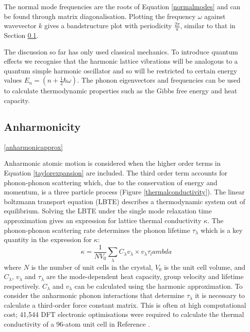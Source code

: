 The normal mode frequencies are the roots of Equation \ref{normalmodes} and can be found through matrix diagonalisation. Plotting the frequency $\omega$ against wavevector $k$ gives a bandstructure plot with periodicity $\frac{2\pi}{a}$, similar to that in Section \ref{}.   %

The discussion so far has only used classical mechanics. To introduce quantum effects we recognise that the harmonic lattice vibrations will be analogous to a quantum simple harmonic oscillator and so will be restricted to certain energy values $E_n = (n+\frac{1}{2}\hbar\omega)$.
The phonon eigenvectors and frequencies can be used to calculate thermodynamic properties such as the Gibbs free energy and heat capacity.



\subsection{Anharmonicity} \ref{anharmonicapprox}

Anharmonic atomic motion is considered when the higher order terms in Equation \ref{taylorexpansion} are included.
The third order term accounts for phonon-phonon scattering which, due to the conservation of energy and momentum, is a three particle process (Figure \ref{thermalconductivity}).%
The linear boltzmann transport equation (LBTE) describes a thermodynamic system out of equilibrium. Solving the LBTE under the single mode relaxation time approximation gives an expression for lattice thermal conductivity $\kappa$. %
The phonon-phonon scattering rate determines the phonon lifetime $\tau_\lambda$ which is a key quantity in the expression for $\kappa$:
\begin{equation}
    \label{thermalconductivity}
    \kappa=\frac{1}{NV_0}\sum_\lambda C_\lambda v_\lambda \times v_\lambda \tau_lambda
\end{equation}
where $N$ is the number of unit cells in the crystal, $V_0$ is the unit cell volume, and $C_\lambda$, $v_\lambda$ and $\tau_\lambda$ are the mode-dependent heat capacity, group velocity and lifetime respectively. $C_\lambda$ and $v_\lambda$ can be calculated using the harmonic approximation. To consider the anharmonic phonon interactions that determine $\tau_\lambda$ it is necessary to calculate a third-order force constant matrix. This is often at high computational cost; 41,544 DFT electronic optimisations were required to calculate the thermal conductivity of a 96-atom unit cell in Reference \cite{Whalley2016}.

